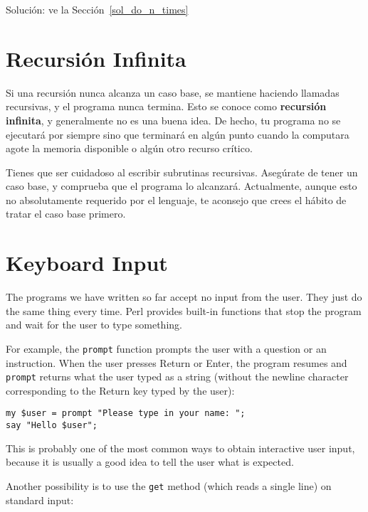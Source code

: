 Solución: ve la Sección~\ref{sol_do_n_times}


\section{Recursión Infinita}


Si una recursión nunca alcanza un caso base, se mantiene 
haciendo llamadas recursivas, y el programa nunca termina. Esto
se conoce como {\bf recursión infinita}, y generalmente no es 
una buena idea. De hecho, tu programa no se ejecutará por siempre
sino que terminará en algún punto cuando la computara agote la 
memoria disponible o algún otro recurso crítico.

Tienes que ser cuidadoso al escribir subrutinas recursivas. 
Asegúrate de tener un caso base, y comprueba que el programa
lo alcanzará. Actualmente, aunque esto no absolutamente requerido
por el lenguaje, te aconsejo que crees el hábito de tratar 
el caso base primero.

\section{Keyboard Input}

The programs we have written so far accept no input from 
the user. They just do the same thing every time. Perl 
provides built-in functions that stop the program and
wait for the user to type something. 

For example, the {\tt prompt} function prompts the user with 
a question or an instruction. When the user presses 
{\sf Return} or {\sf Enter}, the program resumes and 
\verb"prompt" returns what the user typed as a string 
(without the newline character corresponding to the 
{\sf Return} key typed by the user):

\begin{verbatim}
my $user = prompt "Please type in your name: ";
say "Hello $user";
\end{verbatim}
%

This is probably one of the most common ways to obtain 
interactive user input, because it is usually a good idea 
to tell the user what is expected.

Another possibility is to use the {\tt get} method (which
 reads a single line) on standard input:


